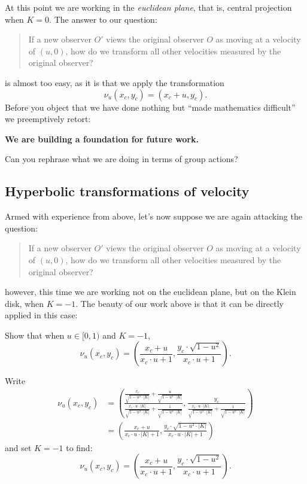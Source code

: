 \documentclass[12pt,noauthor,nooutcomes,handout,hints,newpage]{ximera}
\begin{document}
At this point we are working in the \textit{euclidean plane}, that is,
central projection when $K=0$.
The answer to our question:
\begin{quote}
  If a new observer $O'$ views the original observer $O$ as moving at
  a velocity of $(u,0)$, how do we transform all other velocities
  measured by the original observer?
\end{quote}
is almost too easy, as it is that we apply the transformation
\[
\nu_u(x_c,y_c) = (x_c+u,y_c).
\]
Before you object that we have done nothing but ``made mathematics
difficult'' we preemptively retort:
\begin{center}
  \textbf{We are building a foundation for future work.}
\end{center}

\begin{problem}
  Can you rephrase what we are doing in terms of group actions?
\end{problem}




\subsection{Hyperbolic transformations of velocity}

Armed with experience from above, let's now suppose we are again attacking the question:
\begin{quote}
  If a new observer $O'$ views the original observer $O$ as moving at
  a velocity of $(u,0)$, how do we transform all other velocities
  measured by the original observer?
\end{quote}
however, this time we are working not on the euclidean plane, but on
the Klein disk, when $K=-1$. The beauty of our work above is that it
can be directly applied in this case:

\begin{problem}
  Show that when $u\in [0,1)$ and $K=-1$,
  \[
  \nu_u(x_c,y_c) = \left(\frac{x_c + u}{x_c\cdot u + 1},\frac{y_c\cdot \sqrt{1-u^2}}{x_c\cdot u+1}\right).
  \]
  \begin{freeResponse}
    Write
    \begin{align*}
    \nu_u(x_c,y_c)&=\left(\frac{\frac{x_c}{\sqrt{1-u^2\cdot|K|}} + \frac{u}{\sqrt{1-u^2\cdot|K|}}}
         {\frac{x_c\cdot u \cdot |K|}{\sqrt{1-u^2\cdot|K|}}+\frac{1}{\sqrt{1-u^2\cdot |K|}}},
         \frac{y_c}{\frac{x_c\cdot u \cdot |K|}{\sqrt{1-u^2\cdot|K|}}+\frac{1}{\sqrt{1-u^2\cdot |K|}}}\right)\\
         &=\left(\frac{x_c + u}{x_c\cdot u \cdot |K|+1},\frac{y_c\cdot \sqrt{1-u^2\cdot|K|}}{x_c\cdot u \cdot |K|+1}\right)
    \end{align*}
    and set $K=-1$ to find:
    \[
    \nu_u(x_c,y_c)=\left(\frac{x_c + u}{x_c\cdot u + 1},\frac{y_c\cdot \sqrt{1-u^2}}{x_c\cdot u+1}\right).
    \]
  \end{freeResponse}
\end{problem}
\end{document}
